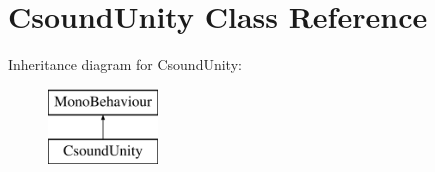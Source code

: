 \hypertarget{class_csound_unity}{}\section{Csound\+Unity Class Reference}
\label{class_csound_unity}
Inheritance diagram for Csound\+Unity\+:\begin{figure}[H]
\begin{center}
\leavevmode
\includegraphics[height=2.000000cm]{class_csound_unity}
\end{center}
\end{figure}
